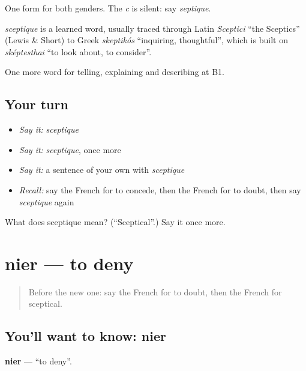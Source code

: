 One form for both genders. The \emph{c} is silent: say \emph{septique}.

\begin{cousinweb}
\emph{sceptique} is a learned word, usually traced through Latin \emph{Sceptici} \textquotedblleft{}the Sceptics\textquotedblright{} (Lewis \& Short) to Greek \emph{skeptikós} \textquotedblleft{}inquiring, thoughtful\textquotedblright{}, which is built on \emph{sképtesthai} \textquotedblleft{}to look about, to consider\textquotedblright{}.
\end{cousinweb}

\begin{grammarlens}[title={What you've built}]
One more word for telling, explaining and describing at B1.
\end{grammarlens}

\subsection*{Your turn}
\begin{itemize}
\raggedright
  \item \emph{Say it:} \emph{sceptique}
  \item \emph{Say it:} \emph{sceptique}, once more
  \item \emph{Say it:} a sentence of your own with \emph{sceptique}
  \item \emph{Recall:} say the French for to concede, then the French for to doubt, then say \emph{sceptique} again
\end{itemize}

\begin{tcolorbox}[breakable,colback=teal!4,colframe=teal!35!black,title={Before you move on}]
What does sceptique mean? (\textquotedblleft{}Sceptical\textquotedblright{}.) Say it once more.
\end{tcolorbox}
\section[nier]{nier — to deny}

\label{lesson:FR-C338-nier}



\begin{quote}
Before the new one: say the French for to doubt, then the French for sceptical.
\end{quote}

\subsection*{You'll want to know: nier}
\textbf{nier} — \textquotedblleft{}to deny\textquotedblright{}.

